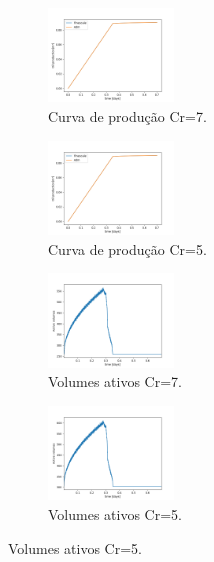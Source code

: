 \documentclass[professionalfont]{beamer}
\begin{document}
\begin{frame}{\FrameProblemName}
    \begin{figure}[!htbp]
        \centering
        \begin{subfigure}{.48\textwidth}
            \centering
            \includegraphics[height=2.5cm]{./imgs/pr4/oil_prod_cr7.png}
            \caption{Curva de produção Cr=7.}
        \end{subfigure}
        \hfill
        \begin{subfigure}{.48\textwidth}
            \centering
            \includegraphics[height=2.5cm]{./imgs/pr4/oil_prod_cr5.png}
            \caption{Curva de produção Cr=5.}
        \end{subfigure}
        \bigskip
        \begin{subfigure}{.48\textwidth}
            \centering
            \includegraphics[height=2.5cm]{./imgs/pr4/active_vols_cr7.png}
            \caption{Volumes ativos Cr=7.}
        \end{subfigure}
        \hfill
        \begin{subfigure}{.48\textwidth}
            \centering
            \includegraphics[height=2.5cm]{./imgs/pr4/active_vols_cr5.png}
            \caption{Volumes ativos Cr=5.}
        \end{subfigure}
        \label{fig:fig5_pr4}
    \end{figure}
\end{frame}
\end{document}
